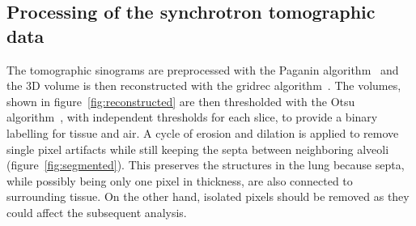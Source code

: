 \subsection{Processing of the synchrotron tomographic data}\label{sec:tomoprocessing}
The tomographic sinograms are preprocessed with the Paganin
algorithm~\parencite{Paganin_2002} and
the 3D volume is then reconstructed with the gridrec
algorithm~\parencite{Marone:pp5022}. The volumes, shown in
figure~\ref{fig:reconstructed} are then thresholded with the Otsu
algorithm~\parencite{Otsu_1979}, with independent thresholds for each slice, to
provide a binary labelling for tissue and air. A cycle of
erosion and dilation is applied to remove single pixel artifacts while still
keeping the septa between neighboring alveoli (figure~\ref{fig:segmented}).
This preserves the structures in the lung because septa, while possibly
being only one pixel in thickness, are also connected to surrounding tissue.
On the other hand, isolated pixels should be removed as they could affect
the subsequent analysis.

